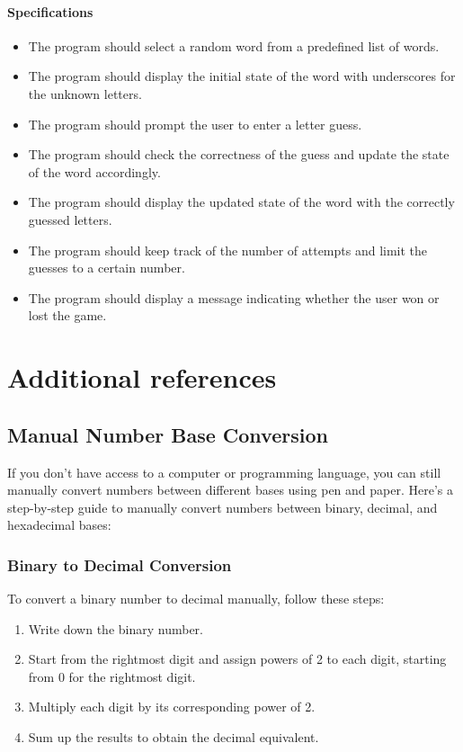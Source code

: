 \documentclass[12pt]{book}
\begin{document}
\subsubsection{Specifications}
\begin{itemize}
\item The program should select a random word from a predefined list of words.
\item The program should display the initial state of the word with underscores for the unknown letters.
\item The program should prompt the user to enter a letter guess.
\item The program should check the correctness of the guess and update the state of the word accordingly.
\item The program should display the updated state of the word with the correctly guessed letters.
\item The program should keep track of the number of attempts and limit the guesses to a certain number.
\item The program should display a message indicating whether the user won or lost the game.
\end{itemize}
\newpage



\chapter{Additional references}

\section{Manual Number Base Conversion}

If you don't have access to a computer or programming language, you can still manually convert numbers between different bases using pen and paper. Here's a step-by-step guide to manually convert numbers between binary, decimal, and hexadecimal bases:

\subsection{Binary to Decimal Conversion}

To convert a binary number to decimal manually, follow these steps:

\begin{enumerate}
\item Write down the binary number.
\item Start from the rightmost digit and assign powers of 2 to each digit, starting from 0 for the rightmost digit.
\item Multiply each digit by its corresponding power of 2.
\item Sum up the results to obtain the decimal equivalent.
\end{enumerate}
\end{document}
